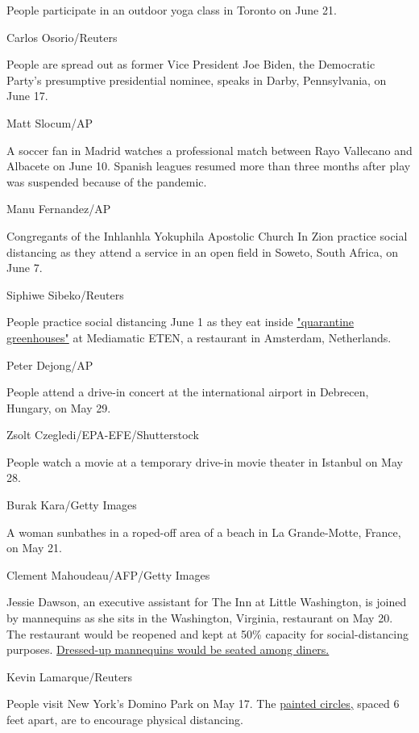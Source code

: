 People participate in an outdoor yoga class in Toronto on June 21.

Carlos Osorio/Reuters

People are spread out as former Vice President Joe Biden, the Democratic
Party's presumptive presidential nominee, speaks in Darby, Pennsylvania,
on June 17.

Matt Slocum/AP

A soccer fan in Madrid watches a professional match between Rayo
Vallecano and Albacete on June 10. Spanish leagues resumed more than
three months after play was suspended because of the pandemic.

Manu Fernandez/AP

Congregants of the Inhlanhla Yokuphila Apostolic Church In Zion practice
social distancing as they attend a service in an open field in Soweto,
South Africa, on June 7.

Siphiwe Sibeko/Reuters

People practice social distancing June 1 as they eat inside
\href{https://www.cnn.com/2020/05/07/world/dutch-restaurant-reopen-greenhouse-trnd/index.html}{"quarantine
greenhouses"} at Mediamatic ETEN, a restaurant in Amsterdam,
Netherlands.

Peter Dejong/AP

People attend a drive-in concert at the international airport in
Debrecen, Hungary, on May 29.

Zsolt Czegledi/EPA-EFE/Shutterstock

People watch a movie at a temporary drive-in movie theater in Istanbul
on May 28.

Burak Kara/Getty Images

A woman sunbathes in a roped-off area of a beach in La Grande-Motte,
France, on May 21.

Clement Mahoudeau/AFP/Getty Images

Jessie Dawson, an executive assistant for The Inn at Little Washington,
is joined by mannequins as she sits in the Washington, Virginia,
restaurant on May 20. The restaurant would be reopened and kept at 50\%
capacity for social-distancing purposes.
\href{https://www.cnn.com/travel/article/restaurant-mannequins-coronavirus-inn-washington-trnd/index.html}{Dressed-up
mannequins would be seated among diners.}

Kevin Lamarque/Reuters

People visit New York's Domino Park on May 17. The
\href{http://www.cnn.com/style/article/domino-park-new-york-city-circles-social-distancing/index.html}{painted
circles,} spaced 6 feet apart, are to encourage physical distancing.

